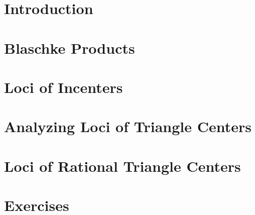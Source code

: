 \section{Introduction}


\section{Blaschke Products}
\label{sec:04-blaschke}
 

\section{Loci of Incenters}
\label{sec:04-proof_theorem}
 

\section{Analyzing Loci of Triangle Centers}
\label{sec:04-loci}
 

\section{Loci of Rational Triangle Centers}
\label{sec:04-rational-trilinears}
  

\section{Exercises}
\label{sec:04-exercises}
